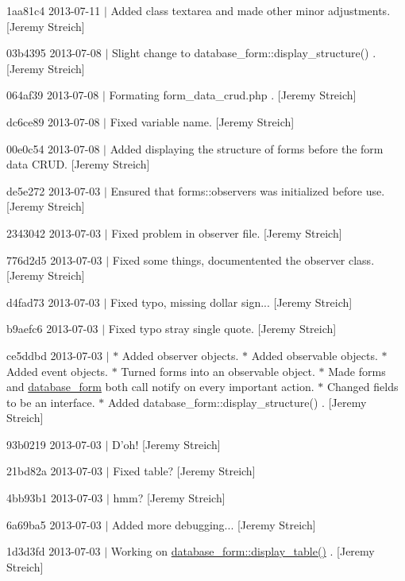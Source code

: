 \begin{DoxyItemize}
\item 1aa81c4 2013-\/07-\/11 $|$ Added class textarea and made other minor adjustments. \mbox{[}Jeremy Streich\mbox{]}
\item 03b4395 2013-\/07-\/08 $|$ Slight change to database\-\_\-form\-::display\-\_\-structure() . \mbox{[}Jeremy Streich\mbox{]}
\item 064af39 2013-\/07-\/08 $|$ Formating form\-\_\-data\-\_\-crud.\-php . \mbox{[}Jeremy Streich\mbox{]}
\item dc6ce89 2013-\/07-\/08 $|$ Fixed variable name. \mbox{[}Jeremy Streich\mbox{]}
\item 00e0c54 2013-\/07-\/08 $|$ Added displaying the structure of forms before the form data C\-R\-U\-D. \mbox{[}Jeremy Streich\mbox{]}
\item de5e272 2013-\/07-\/03 $|$ Ensured that forms\-::observers was initialized before use. \mbox{[}Jeremy Streich\mbox{]}
\item 2343042 2013-\/07-\/03 $|$ Fixed problem in observer file. \mbox{[}Jeremy Streich\mbox{]}
\item 776d2d5 2013-\/07-\/03 $|$ Fixed some things, documentented the observer class. \mbox{[}Jeremy Streich\mbox{]}
\item d4fad73 2013-\/07-\/03 $|$ Fixed typo, missing dollar sign... \mbox{[}Jeremy Streich\mbox{]}
\item b9aefc6 2013-\/07-\/03 $|$ Fixed typo stray single quote. \mbox{[}Jeremy Streich\mbox{]}
\item ce5ddbd 2013-\/07-\/03 $|$ $\ast$ Added observer objects. $\ast$ Added observable objects. $\ast$ Added event objects. $\ast$ Turned forms into an observable object. $\ast$ Made forms and \hyperlink{classdatabase__form}{database\-\_\-form} both call notify on every important action. $\ast$ Changed fields to be an interface. $\ast$ Added database\-\_\-form\-::display\-\_\-structure() . \mbox{[}Jeremy Streich\mbox{]}
\item 93b0219 2013-\/07-\/03 $|$ D'oh! \mbox{[}Jeremy Streich\mbox{]}
\item 21bd82a 2013-\/07-\/03 $|$ Fixed table? \mbox{[}Jeremy Streich\mbox{]}
\item 4bb93b1 2013-\/07-\/03 $|$ hmm? \mbox{[}Jeremy Streich\mbox{]}
\item 6a69ba5 2013-\/07-\/03 $|$ Added more debugging... \mbox{[}Jeremy Streich\mbox{]}
\item 1d3d3fd 2013-\/07-\/03 $|$ Working on \hyperlink{classdatabase__form_a73106bec9001ca0fe255e74a37982072}{database\-\_\-form\-::display\-\_\-table()} . \mbox{[}Jeremy Streich\mbox{]}

\end{DoxyItemize}
